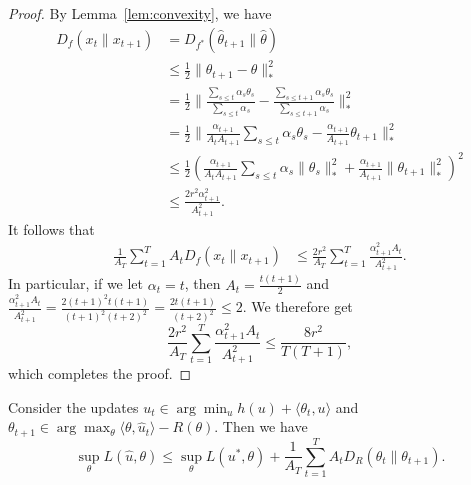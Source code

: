 \documentclass{article}
\begin{document}
\begin{proof}
By Lemma~\ref{lem:convexity}, we have 
\begin{align*}
D_f(x_t \| x_{t+1}) &= D_{f^*}(\hat{\theta}_{t+1} \| \hat{\theta}) \\
 &\leq \frac{1}{2}\|\theta_{t+1}-\theta\|_{*}^2 \\
 &= \frac{1}{2}\|\frac{\sum_{s \leq t}\alpha_s\theta_s}{\sum_{s \leq t} \alpha_s} - \frac{\sum_{s \leq t+1}\alpha_s\theta_s}{\sum_{s \leq t+1} \alpha_s}\|_{*}^2 \\
 &= \frac{1}{2}\|\frac{\alpha_{t+1}}{A_tA_{t+1}} \sum_{s \leq t} \alpha_s\theta_s - \frac{\alpha_{t+1}}{A_{t+1}} \theta_{t+1}\|_{*}^2 \\
 &\leq \frac{1}{2} \left(\frac{\alpha_{t+1}}{A_tA_{t+1}} \sum_{s \leq t} \alpha_s\|\theta_s\|_{*}^2 + \frac{\alpha_{t+1}}{A_{t+1}} \|\theta_{t+1}\|_{*}^2\right)^2 \\
 &\leq \frac{2r^2\alpha_{t+1}^2}{A_{t+1}^2}.
\end{align*}
It follows that 
\begin{align*}
\frac{1}{A_T} \sum_{t=1}^T A_tD_f(x_t \| x_{t+1}) &\leq \frac{2r^2}{A_T} \sum_{t=1}^T \frac{\alpha_{t+1}^2A_t}{A_{t+1}^2}.
\end{align*}
In particular, if we let $\alpha_t = t$, then $A_t = \frac{t(t+1)}{2}$ and 
$\frac{\alpha_{t+1}^2A_t}{A_{t+1}^2} = \frac{2(t+1)^2t(t+1)}{(t+1)^2(t+2)^2} = \frac{2t(t+1)}{(t+2)^2} \leq 2$.
We therefore get
\begin{equation}
\frac{2r^2}{A_T} \sum_{t=1}^T \frac{\alpha_{t+1}^2A_t}{A_{t+1}^2} \leq \frac{8r^2}{T(T+1)},
\end{equation}
which completes the proof.
\end{proof}
\begin{proposition}
\label{prop:method-2}
Consider the updates $u_t \in \arg\min_{u} h(u) + \langle \theta_t, u \rangle$ 
and $\theta_{t+1} \in \arg\max_{\theta} \langle \theta, \hat{u}_t \rangle - R(\theta)$. 
Then we have 
\begin{equation}
\sup_{\theta} L(\hat{u}, \theta) \leq \sup_{\theta} L(u^*, \theta) + \frac{1}{A_T} \sum_{t=1}^T A_tD_{R}(\theta_t \| \theta_{t+1}).
\end{equation}
\end{proposition}
\end{document}

